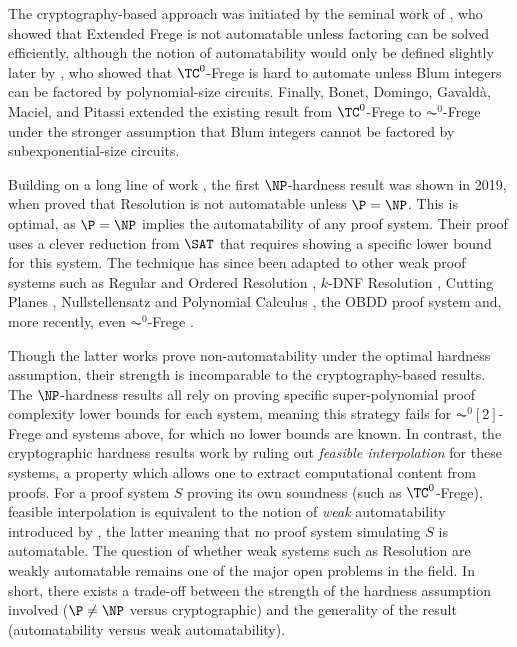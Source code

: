 \documentclass[11pt]{article}
\theoremstyle{definition}
\theoremstyle{plain}
\theoremstyle{remark}
\begin{document}
The cryptography-based approach was initiated by the seminal work of \citeauthor{KP98} \cite{KP98}, who showed that Extended Frege is not automatable unless factoring can be solved efficiently, although the notion of automatability would only be defined slightly later by \citeauthor{BPR1997} \cite{BPR1997}, who showed that $\TC^0$-Frege is hard to automate unless Blum integers can be factored by polynomial-size circuits. Finally, Bonet, Domingo, Gavaldà, Maciel, and Pitassi \cite{BDGMP04} extended the existing result from $\TC^0$-Frege to $\AC^0$-Frege under the stronger assumption that Blum integers cannot be factored by subexponential-size circuits.

Building on a long line of work \cite{buss1995godel, Iwa97, pudlak03, AB04, ABMP98, AR08, mertz}, the first $\NP$-hardness result was shown in 2019, when \citeauthor{AM20} \cite{AM20} proved that Resolution is not automatable unless $\P = \NP$. This is optimal, as $\P = \NP$ implies the automatability of any proof system. Their proof uses a clever reduction from $\SAT$ that requires showing a specific lower bound for this system. The technique has since been adapted to other weak proof systems such as Regular and Ordered Resolution \cite{B20}, $k$-DNF Resolution \cite{G20}, Cutting Planes \cite{GKSMP20}, Nullstellensatz and Polynomial Calculus \cite{dRGNRS21}, the OBDD proof system \cite{IR22} and, more recently, even $\AC^0$-Frege \cite{P23}.

Though the latter works prove non-automatability under the optimal hardness assumption, their strength is incomparable to the cryptography-based results. The $\NP$-hardness results all rely on proving specific super-polynomial proof complexity lower bounds for each system, meaning this strategy fails for $\AC^0[2]$-Frege and systems above, for which no lower bounds are known. In contrast, the cryptographic hardness results work by ruling out \emph{feasible interpolation} for these systems, a property which allows one to extract computational content from proofs. For a proof system $S$ proving its own soundness (such as $\TC^0$-Frege), feasible interpolation is equivalent to the notion of \emph{weak} automatability introduced by \citeauthor{AB04} \cite{AB04}, the latter meaning that no proof system simulating $S$ is automatable. The question of whether weak systems such as Resolution are weakly automatable remains one of the major open problems in the field. In short, there exists a trade-off between the strength of the hardness assumption involved ($\P \neq \NP$ versus cryptographic) and the generality of the result (automatability versus weak automatability).
\end{document}
